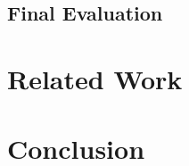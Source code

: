 \documentclass[11pt,letterpaper]{article}
\begin{document}





\subsection{Final Evaluation}


\section{Related Work}

\section{Conclusion}




\end{document}
